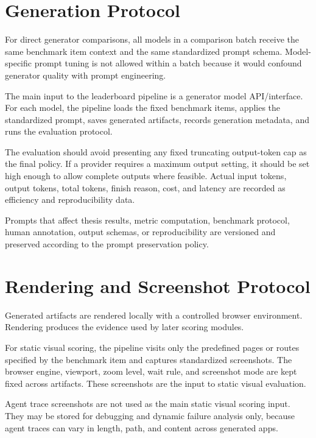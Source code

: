 \section{Generation Protocol}
\label{sec:generation-protocol}

For direct generator comparisons, all models in a comparison batch receive the
same benchmark item context and the same standardized prompt schema. Model-
specific prompt tuning is not allowed within a batch because it would confound
generator quality with prompt engineering.

The main input to the leaderboard pipeline is a generator model API/interface.
For each model, the pipeline loads the fixed benchmark items, applies the
standardized prompt, saves generated artifacts, records generation metadata, and
runs the evaluation protocol.

The evaluation should avoid presenting any fixed truncating output-token cap as
the final policy. If a provider requires a maximum output setting, it should be
set high enough to allow complete outputs where feasible. Actual input tokens,
output tokens, total tokens, finish reason, cost, and latency are recorded as
efficiency and reproducibility data.

Prompts that affect thesis results, metric computation, benchmark protocol,
human annotation, output schemas, or reproducibility are versioned and preserved
according to the prompt preservation policy.

\section{Rendering and Screenshot Protocol}
\label{sec:rendering}

Generated artifacts are rendered locally with a controlled browser environment.
Rendering produces the evidence used by later scoring modules.

For static visual scoring, the pipeline visits only the predefined pages or
routes specified by the benchmark item and captures standardized screenshots.
The browser engine, viewport, zoom level, wait rule, and screenshot mode are
kept fixed across artifacts. These screenshots are the input to static visual
evaluation.

Agent trace screenshots are not used as the main static visual scoring input.
They may be stored for debugging and dynamic failure analysis only, because
agent traces can vary in length, path, and content across generated apps.

